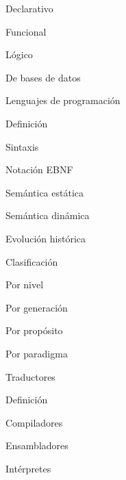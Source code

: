 \begin{longenum}
\begin{longenum}
\begin{longenum}
\begin{longenum}
            \end{longenum}
            \item Declarativo
            \begin{longenum}
                \item Funcional
                \item Lógico
                \item De bases de datos
            \end{longenum}
        \end{longenum}
        \item Lenguajes de programación
        \begin{longenum}
            \item Definición
            \begin{longenum}
                \item Sintaxis
                \begin{longenum}
                    \item Notación EBNF
                \end{longenum}
                \item Semántica estática
                \item Semántica dinámica
            \end{longenum}
            \item Evolución histórica
            \item Clasificación
            \begin{longenum}
                \item Por nivel
                \item Por generación
                \item Por propósito
                \item Por paradigma
            \end{longenum}
        \end{longenum}
        \item Traductores
        \begin{longenum}
            \item Definición
            \item Compiladores
            \begin{longenum}
                \item Ensambladores
            \end{longenum}
            \item Intérpretes
            \begin{longenum}

\end{longenum}
\end{longenum}
\end{longenum}
\end{longenum}
